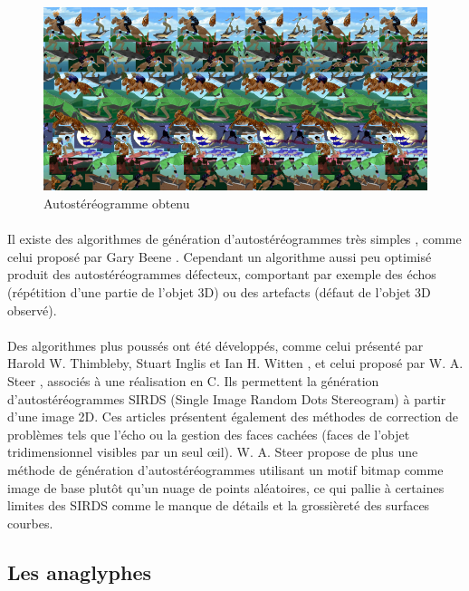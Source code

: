 \begin{figure}[h]
		\centering
		\includegraphics[scale=0.4]{autostereog.png}
		\caption{\label{fig:autostereogramme} Autostéréogramme obtenu \protect \footnotemark }
\end{figure}

\paragraph{}
Il existe des algorithmes de génération d’autostéréogrammes très simples , comme celui proposé par Gary Beene \cite{garybeene}. Cependant un algorithme aussi peu optimisé produit des autostéréogrammes défecteux, comportant par exemple des échos (répétition d'une partie de l'objet 3D) ou des artefacts (défaut de l'objet 3D observé).

\paragraph{}
Des algorithmes plus poussés ont été développés, comme celui présenté par Harold W. Thimbleby, Stuart Inglis et Ian H. Witten \cite{stereogram}, et celui proposé par W. A. Steer \cite{wasteer}, associés à une réalisation en C. Ils permettent la génération d’autostéréogrammes SIRDS (Single Image Random Dots Stereogram) à partir d’une image 2D. Ces articles présentent également des méthodes de correction de problèmes tels que l'écho ou la gestion des faces cachées (faces de l'objet tridimensionnel visibles par un seul œil). W. A. Steer propose de plus une méthode de génération d'autostéréogrammes utilisant un motif bitmap comme image de base plutôt qu'un nuage de points aléatoires, ce qui pallie à certaines limites des SIRDS comme le manque de détails et la grossièreté des surfaces courbes.


\subsection{Les anaglyphes}

